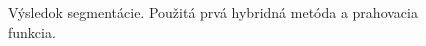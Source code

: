 \documentclass[a4paper,11pt,oneside]{article}%
\begin{document}
\begin{figure}[H]
    \hspace{5px}
    \hspace{5px}
    \caption{Výsledok segmentácie. Použitá prvá hybridná metóda a prahovacia funkcia.}
    \label{fig:hybrid1_tf}
\end{figure}
\end{document}
